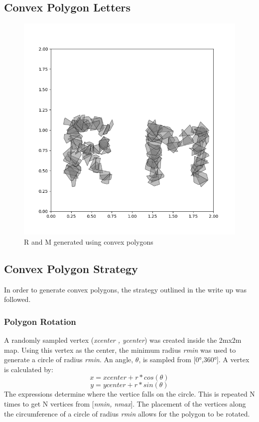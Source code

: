\documentclass{article}
\begin{document}
\subsection{Convex Polygon Letters}
\begin{figure}[H]
  \centering
  \begin{minipage}{0.45\textwidth}
    \includegraphics[width=\linewidth]{part1_letters.png}
    \caption{R and M generated using convex polygons}
  \end{minipage}\hfill
\end{figure}
\subsection{Convex Polygon Strategy}
In order to generate convex polygons, the strategy outlined in the write up was followed.
\subsubsection{Polygon Rotation}
A randomly sampled vertex (\textit{xcenter , ycenter}) was created inside the 2mx2m map. Using this vertex as the center, the minimum radius \textit{rmin} was used to generate a circle of radius \textit{rmin}. An angle, $\theta$, is sampled from [0°,360°]. A vertex is calculated by: 
    \[x = xcenter + r*cos(\theta)\]
    \[y = ycenter + r*sin(\theta)\]
 The expressions determine where the vertice falls on the circle. This is repeated N times to get N vertices from [\textit{nmin, nmax}]. The placement of the vertices along the circumference of a circle of radius \textit{rmin} allows for the polygon to be rotated.
\end{document}
